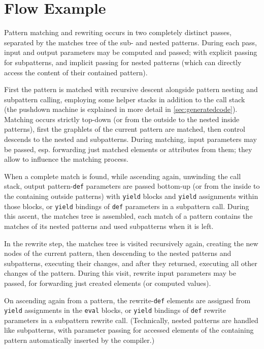 

\section{Flow Example}\label{matchingflow}

Pattern matching and rewriting occurs in two completely distinct passes, separated by the matches tree of the sub- and nested patterns.
During each pass, input and output parameters may be computed and passed; with explicit passing for subpatterns, and implicit passing for nested patterns (which can directly access the content of their contained pattern).

First the pattern is matched with recursive descent alongside pattern nesting and subpattern calling, employing some helper stacks in addition to the call stack (the pushdown machine is explained in more detail in \ref{sec:generatedcode}).
Matching occurs strictly top-down (or from the outside to the nested inside patterns), first the graphlets of the current pattern are matched, then control descends to the nested and subpatterns.
During matching, input parameters may be passed, esp. forwarding just matched elements or attributes from them; they allow to influence the matching process.

When a complete match is found, while ascending again, unwinding the call stack, output pattern-\texttt{def} parameters are passed bottom-up (or from the inside to the containing outside patterns) with \texttt{yield} blocks and \texttt{yield} assignments within those blocks, or \texttt{yield} bindings of \texttt{def} parameters in a subpattern call.
During this ascent, the matches tree is assembled, each match of a pattern contains the matches of its nested patterns and used subpatterns when it is left.

In the rewrite step, the matches tree is visited recursively again, creating the new nodes of the current pattern, then descending to the nested patterns and subpatterns, executing their changes, and after they returned, executing all other changes of the pattern.
During this visit, rewrite input parameters may be passed, for forwarding just created elements (or computed values). 

On ascending again from a pattern, the rewrite-\texttt{def} elements are assigned from \texttt{yield} assignments in the \texttt{eval} blocks, or \texttt{yield} bindings of \texttt{def} rewrite parameters in a subpattern rewrite call.
(Technically, nested patterns are handled like subpatterns, with parameter passing for accessed elements of the containing pattern automatically inserted by the compiler.)

